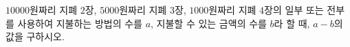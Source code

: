 $10000$원짜리 지폐 $2$장, $5000$원짜리 지폐 $3$장, $1000$원짜리 지폐 $4$장의 일부 또는 전부를 사용하여 지불하는 방법의 수를 $a$, 지불할 수 있는 금액의 수를 $b$라 할 때, $a-b$의 값을 구하시오. 
